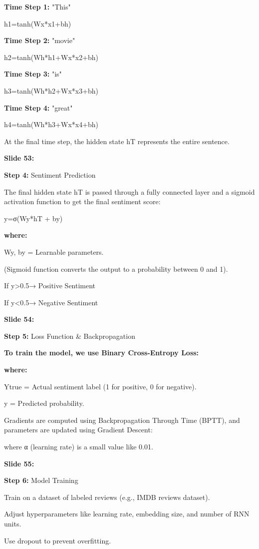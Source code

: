\documentclass[11pt,a4paper]{article}
\begin{document}
\textbf{Time Step 1:}  "This"

h1=tanh(Wx*x1+bh)

\textbf{Time Step 2:}  "movie"

h2=tanh(Wh*h1+Wx*x2+bh)

\textbf{Time Step 3:}  "is"

h3=tanh(Wh*h2+Wx*x3+bh)

\textbf{Time Step 4:}  "great"

h4=tanh(Wh*h3+Wx*x4+bh)

At the final time step, the hidden state hT​ represents the entire sentence.

\textbf{Slide 53:}

\textbf{Step 4:}  Sentiment Prediction

The final hidden state hT​ is passed through a fully connected layer and a sigmoid activation function to get the final sentiment score:

y=σ(Wy*hT + by)

\textbf{where:} 

Wy​, by​ = Learnable parameters.

(Sigmoid function converts the output to a probability between 0 and 1).

If y>0.5→ Positive Sentiment

If y<0.5→ Negative Sentiment

\textbf{Slide 54:}

\textbf{Step 5:}  Loss Function \& Backpropagation

\textbf{To train the model, we use Binary Cross-Entropy Loss:} 

\textbf{where:} 

Ytrue = Actual sentiment label (1 for positive, 0 for negative).

y = Predicted probability.

Gradients are computed using Backpropagation Through Time (BPTT), and parameters are updated using Gradient Descent:

where α  (learning rate) is a small value like 0.01.

\textbf{Slide 55:}

\textbf{Step 6:}  Model Training

Train on a dataset of labeled reviews (e.g., IMDB reviews dataset).

Adjust hyperparameters like learning rate, embedding size, and number of RNN units.

Use dropout to prevent overfitting.
\end{document}
